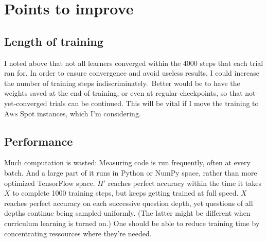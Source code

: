 \documentclass{farlamp}
\begin{document}
\section{Points to improve}

\subsection{Length of training}

I noted above that not all learners converged within the 4000 steps that each
trial ran for. In order to ensure convergence and avoid useless results, I could
increase the number of training steps indiscriminately.\TODO\ Better would be to
have the weights saved at the end of training, or even at regular checkpoints,
so that not-yet-converged trials can be continued. This will be vital if I move
the training to \textsc{Aws} Spot instances, which I'm considering.


\subsection{Performance}

Much computation is wasted: Measuring code is run frequently, often at every
batch. And a large part of it runs in Python or NumPy space, rather than more
optimized TensorFlow space. $H'$ reaches perfect accuracy within the time it
takes $X$ to complete 1000 training steps, but keeps getting trained at full
speed. $X$ reaches perfect accuracy on each successive question depth, yet
questions of all depths continue being sampled uniformly. (The latter might be
different when curriculum learning is turned on.) One should be able to reduce
training time by concentrating ressources where they're needed.

\printbibliography
\end{document}
